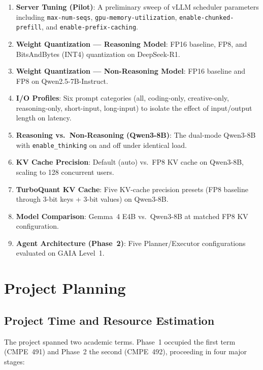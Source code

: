 \documentclass[a4paper,12pt]{report}
\begin{document}
\begin{enumerate}
    \item \textbf{Server Tuning (Pilot)}: A preliminary sweep of vLLM scheduler parameters including \texttt{max-num-seqs}, \texttt{gpu-memory-utilization}, \texttt{enable-chunked-prefill}, and \texttt{enable-prefix-caching}.
    \item \textbf{Weight Quantization --- Reasoning Model}: FP16 baseline, FP8, and BitsAndBytes (INT4) quantization on DeepSeek-R1.
    \item \textbf{Weight Quantization --- Non-Reasoning Model}: FP16 baseline and FP8 on Qwen2.5-7B-Instruct.
    \item \textbf{I/O Profiles}: Six prompt categories (all, coding-only, creative-only, reasoning-only, short-input, long-input) to isolate the effect of input/output length on latency.
    \item \textbf{Reasoning vs.\ Non-Reasoning (Qwen3-8B)}: The dual-mode Qwen3-8B with \texttt{enable\_thinking} on and off under identical load.
    \item \textbf{KV Cache Precision}: Default (auto) vs.\ FP8 KV cache on Qwen3-8B, scaling to 128 concurrent users.
    \item \textbf{TurboQuant KV Cache}: Five KV-cache precision presets (FP8 baseline through 3-bit keys + 3-bit values) on Qwen3-8B.
    \item \textbf{Model Comparison}: Gemma~4 E4B vs.\ Qwen3-8B at matched FP8 KV configuration.
    \item \textbf{Agent Architecture (Phase~2)}: Five Planner/Executor configurations evaluated on GAIA Level~1.
\end{enumerate}

\section{Project Planning}

\subsection{Project Time and Resource Estimation}

The project spanned two academic terms. Phase~1 occupied the first term (CMPE~491) and Phase~2 the second (CMPE~492), proceeding in four major stages:
\end{document}
